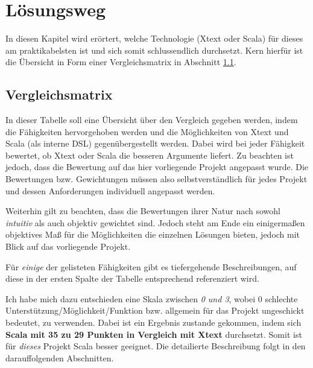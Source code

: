 \chapter{Lösungsweg}

In diesen Kapitel wird erörtert, welche Technologie (Xtext oder Scala) für
dieses am praktikabelsten ist und sich somit schlussendlich durchsetzt.
Kern hierfür ist die Übersicht in Form einer Vergleichsmatrix in Abschnitt
\ref{sec-vergleichsmatrix}.

\section{Vergleichsmatrix}\label{sec-vergleichsmatrix}

In dieser Tabelle soll eine Übersicht über den Vergleich gegeben werden, indem
die Fähigkeiten hervorgehoben werden und die Möglichkeiten von Xtext und
Scala (als interne DSL) gegenübergestellt werden. Dabei wird bei jeder
Fähigkeit bewertet, ob Xtext oder Scala die besseren Argumente liefert.
Zu beachten ist jedoch, dass die Bewertung auf das hier vorliegende Projekt
angepasst wurde. Die Bewertungen bzw. Gewichtungen müssen also
selbstverständlich für jedes Projekt und dessen Anforderungen individuell
angepasst werden.

Weiterhin gilt zu beachten, dass die Bewertungen ihrer Natur nach sowohl
\emph{intuitiv} als auch objektiv gewichtet sind. Jedoch steht am Ende
ein einigermaßen objektives Maß für die Möglichkeiten die einzelnen Lösungen
bieten, jedoch mit Blick auf das vorliegende Projekt.

Für \emph{einige} der gelisteten Fähigkeiten gibt es
tiefergehende Beschreibungen, auf diese
in der ersten Spalte der Tabelle entsprechend referenziert wird.

Ich habe mich dazu entschieden eine Skala zwischen \emph{0 und 3}, wobei
0 schlechte Unterstützung/Möglichkeit/Funktion bzw. allgemein für das Projekt
ungeschickt bedeutet, zu verwenden.
Dabei ist ein Ergebnis zustande gekommen, indem sich \textbf{Scala mit 35 zu
29 Punkten in Vergleich mit Xtext} durchsetzt.
Somit ist für \emph{dieses} Projekt Scala besser geeignet.
Die detailierte Beschreibung folgt in den darauffolgenden Abschnitten.

